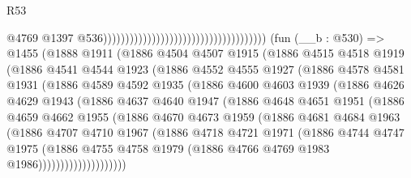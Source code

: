\begin{lexlean}{R53}
\begin{coremodule}
                                                                              @4769
                                                                              @1397
                                                                              @536)))))))))))))))))))))))))))))))))))))
    (fun (__b : @530) =>
    @1455
      (@1888
        @1911
        (@1886
          @4504
          @4507
          @1915
          (@1886
            @4515
            @4518
            @1919
            (@1886
              @4541
              @4544
              @1923
              (@1886
                @4552
                @4555
                @1927
                (@1886
                  @4578
                  @4581
                  @1931
                  (@1886
                    @4589
                    @4592
                    @1935
                    (@1886
                      @4600
                      @4603
                      @1939
                      (@1886
                        @4626
                        @4629
                        @1943
                        (@1886
                          @4637
                          @4640
                          @1947
                          (@1886
                            @4648
                            @4651
                            @1951
                            (@1886
                              @4659
                              @4662
                              @1955
                              (@1886
                                @4670
                                @4673
                                @1959
                                (@1886
                                  @4681
                                  @4684
                                  @1963
                                  (@1886
                                    @4707
                                    @4710
                                    @1967
                                    (@1886
                                      @4718
                                      @4721
                                      @1971
                                      (@1886
                                        @4744
                                        @4747
                                        @1975
                                        (@1886
                                          @4755
                                          @4758
                                          @1979
                                          (@1886 @4766 @4769 @1983 @1986))))))))))))))))))))

\end{coremodule}
\end{lexlean}

